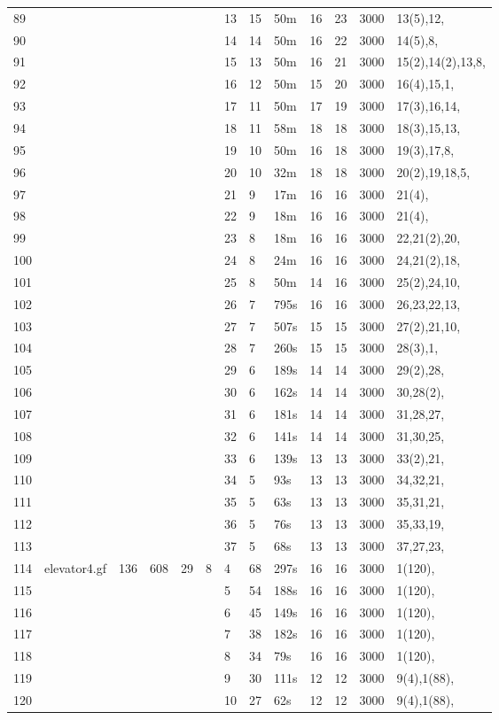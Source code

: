 \documentclass{article}
\begin{document}
\begin{longtable}{|l |l |l |l |l |l |l |l |l |l |l |l |l |}
89&&&&&&13&15&50m&16&23&3000&13(5),12,\\
90&&&&&&14&14&50m&16&22&3000&14(5),8,\\
91&&&&&&15&13&50m&16&21&3000&15(2),14(2),13,8,\\
92&&&&&&16&12&50m&15&20&3000&16(4),15,1,\\
93&&&&&&17&11&50m&17&19&3000&17(3),16,14,\\
94&&&&&&18&11&58m&18&18&3000&18(3),15,13,\\
95&&&&&&19&10&50m&16&18&3000&19(3),17,8,\\
96&&&&&&20&10&32m&18&18&3000&20(2),19,18,5,\\
97&&&&&&21&9&17m&16&16&3000&21(4),\\
98&&&&&&22&9&18m&16&16&3000&21(4),\\
99&&&&&&23&8&18m&16&16&3000&22,21(2),20,\\
100&&&&&&24&8&24m&16&16&3000&24,21(2),18,\\
101&&&&&&25&8&50m&14&16&3000&25(2),24,10,\\
102&&&&&&26&7&795s&16&16&3000&26,23,22,13,\\
103&&&&&&27&7&507s&15&15&3000&27(2),21,10,\\
104&&&&&&28&7&260s&15&15&3000&28(3),1,\\
105&&&&&&29&6&189s&14&14&3000&29(2),28,\\
106&&&&&&30&6&162s&14&14&3000&30,28(2),\\
107&&&&&&31&6&181s&14&14&3000&31,28,27,\\
108&&&&&&32&6&141s&14&14&3000&31,30,25,\\
109&&&&&&33&6&139s&13&13&3000&33(2),21,\\
110&&&&&&34&5&93s&13&13&3000&34,32,21,\\
111&&&&&&35&5&63s&13&13&3000&35,31,21,\\
112&&&&&&36&5&76s&13&13&3000&35,33,19,\\
113&&&&&&37&5&68s&13&13&3000&37,27,23,\\
114&elevator4.gf&136&608&29&8&4&68&297s&16&16&3000&1(120),\\
115&&&&&&5&54&188s&16&16&3000&1(120),\\
116&&&&&&6&45&149s&16&16&3000&1(120),\\
117&&&&&&7&38&182s&16&16&3000&1(120),\\
118&&&&&&8&34&79s&16&16&3000&1(120),\\
119&&&&&&9&30&111s&12&12&3000&9(4),1(88),\\
120&&&&&&10&27&62s&12&12&3000&9(4),1(88),\\

\end{longtable}
\end{document}
